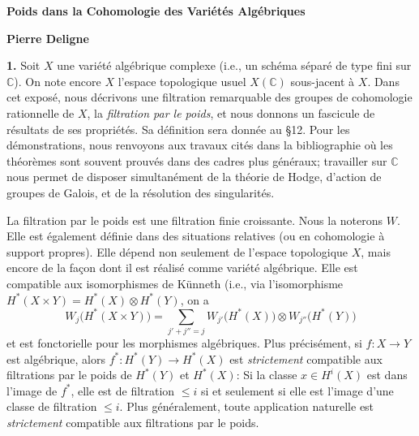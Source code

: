 \documentclass[8pt]{extarticle}
\newcommand{\DSourceFolio}{--}
\newcommand{\DAuthorityPage}{--}
\newcommand{\SourcePage}[2]{%
  \renewcommand{\DSourceFolio}{#1}%
  \renewcommand{\DAuthorityPage}{#2}%
  \thispagestyle{dpage}%
}
\newcommand{\ReaderFont}{\fontsize{7.35}{8.15}\selectfont}
\newcommand{\NumPara}[1]{\par\noindent\textbf{#1}\enspace}
\newcommand{\C}{\mathbb{C}}
\begin{document}
\ReaderFont

\SourcePage{79}{1}

\vspace*{15mm}
\begin{center}
{\sffamily\bfseries\fontsize{15}{17}\selectfont Poids dans la Cohomologie des Variétés Algébriques\par}
\vspace{5mm}
{\sffamily\bfseries\fontsize{10}{11}\selectfont Pierre Deligne\par}
\end{center}
\vspace{5mm}

\NumPara{1.} Soit \(X\) une variété algébrique complexe (i.e., un schéma séparé de type fini sur \(\C\)). On note encore \(X\) l'espace topologique usuel \(X(\C)\) sous-jacent à \(X\). Dans cet exposé, nous décrivons une filtration remarquable des groupes de cohomologie rationnelle de \(X\), la \emph{filtration par le poids}, et nous donnons un fascicule de résultats de ses propriétés. Sa définition sera donnée au §12. Pour les démonstrations, nous renvoyons aux travaux cités dans la bibliographie où les théorèmes sont souvent prouvés dans des cadres plus généraux; travailler sur \(\C\) nous permet de disposer simultanément de la théorie de Hodge, d'action de groupes de Galois, et de la résolution des singularités.

La filtration par le poids est une filtration finie croissante. Nous la noterons \(W\). Elle est également définie dans des situations relatives (ou en cohomologie à support propres). Elle dépend non seulement de l'espace topologique \(X\), mais encore de la façon dont il est réalisé comme variété algébrique. Elle est compatible aux isomorphismes de Künneth (i.e., via l'isomorphisme \(H^*(X\times Y)=H^*(X)\otimes H^*(Y)\), on a
\[
W_j\bigl(H^*(X\times Y)\bigr)=\sum_{j'+j''=j}W_{j'}\bigl(H^*(X)\bigr)\otimes W_{j''}\bigl(H^*(Y)\bigr)
\]
et est fonctorielle pour les morphismes algébriques. Plus précisément, si \(f:X\to Y\) est algébrique, alors \(f^*:H^*(Y)\to H^*(X)\) est \emph{strictement} compatible aux filtrations par le poids de \(H^*(Y)\) et \(H^*(X)\): Si la classe \(x\in H^i(X)\) est dans l'image de \(f^*\), elle est de filtration \(\le i\) si et seulement si elle est l'image d'une classe de filtration \(\le i\). Plus généralement, toute application naturelle est \emph{strictement} compatible aux filtrations par le poids.
\end{document}
